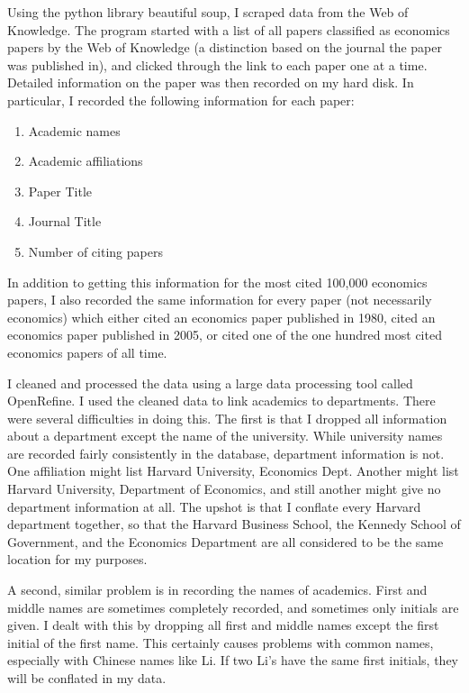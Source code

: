 Using the python library beautiful soup, I scraped data from the Web of
Knowledge. The program started with a list of all papers classified as
economics papers by the Web of Knowledge (a distinction based on the
journal the paper was published in), and clicked through the link to
each paper one at a time. Detailed information on the paper was then
recorded on my hard disk. In particular, I recorded the following
information for each paper:

\begin{enumerate}
\def\labelenumi{\arabic{enumi}.}
\itemsep1pt\parskip0pt
\item
  Academic names
\item
  Academic affiliations
\item
  Paper Title
\item
  Journal Title
\item
  Number of citing papers
\end{enumerate}

In addition to getting this information for the most cited 100,000
economics papers, I also recorded the same information for every paper
(not necessarily economics) which either cited an economics paper
published in 1980, cited an economics paper published in 2005, or cited
one of the one hundred most cited economics papers of all time.

I cleaned and processed the data using a large data processing tool
called OpenRefine. I used the cleaned data to link academics to
departments. There were several difficulties in doing this. The first is
that I dropped all information about a department except the name of the
university. While university names are recorded fairly consistently in
the database, department information is not. One affiliation might list
Harvard University, Economics Dept. Another might list Harvard
University, Department of Economics, and still another might give no
department information at all. The upshot is that I conflate every
Harvard department together, so that the Harvard Business School, the
Kennedy School of Government, and the Economics Department are all
considered to be the same location for my purposes.

A second, similar problem is in recording the names of academics. First
and middle names are sometimes completely recorded, and sometimes only
initials are given. I dealt with this by dropping all first and middle
names except the first initial of the first name. This certainly causes
problems with common names, especially with Chinese names like Li. If
two Li's have the same first initials, they will be conflated in my
data.

